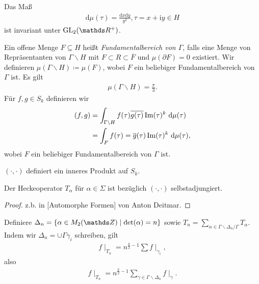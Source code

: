 \begin{prop}
Das Maß
\begin{align*}
\mathrm{d}\mu(\tau)=\frac{\mathrm{d}x\mathrm{d}y}{y^2}, \tau=x+\mathrm{i}y \in H
\end{align*}
ist invariant unter $\GL_2(\R^+)$.
\end{prop}

\begin{defi}
Ein offene Menge $F \subseteq H$ heißt \emph{Fundamentalbereich von $\Gamma$}, falls eine Menge von Repräsentanten von $\Gamma\backslash H$ mit
$F \subset R \subset \overline{F}$ und $\mu(\partial F)=0$ existiert.
Wir definieren $\mu(\Gamma\backslash H)\coloneqq \mu(F)$, wobei $F$ ein beliebiger Fundamentalbereich von $\Gamma$ ist.
Es gilt
\begin{align*}
\mu(\Gamma \backslash H)=\frac{\pi}{3}.
\end{align*} 
Für $f,g\in S_k$ definieren wir
\begin{align*}
(f,g)&=\int_{\Gamma \backslash H} f(\tau)\overline{g(\tau)} \operatorname{Im}(\tau)^k ~\mathrm{d}\mu(\tau)\\
&=\int_F f(\tau)=\overline{g}(\tau)\operatorname{Im}(\tau)^k~\mathrm{d}\mu(\tau),
\end{align*}
wobei $F$ ein beliebiger Fundamentalbereich von $\Gamma$ ist.
\end{defi}

\begin{thm}
$(\cdot,\cdot)$ definiert ein inneres Produkt auf $S_k$.
\end{thm}

\begin{thm}
Der Heckeoperator $T_\alpha$ für $\alpha \in \Sigma$ ist bezüglich $(\cdot,\cdot)$ selbstadjungiert.
\end{thm}
\begin{proof}
z.b. in [Automorphe Formen] von Anton Deitmar.
\end{proof}

Definiere $\Delta_n=\{\alpha \in M_2(\Z)\mid \det(\alpha)=n\}$ sowie
$T_n=\sum_{\alpha \in \Gamma \backslash \Delta_n /\Gamma} T_\alpha$.
Indem wir $\Delta_n=\cup \Gamma \gamma_i$ schreiben, gilt
\begin{align*}
f\mid_{T_n} =n^{\frac{k}{2}-1} \sum f\mid_{\gamma_i},
\end{align*}
also
\begin{align*}
f\mid_{T_n}=n^{\frac{k}{2}-1} \sum_{\gamma \in \Gamma \backslash \Delta_n} f\mid_\gamma.
\end{align*}

